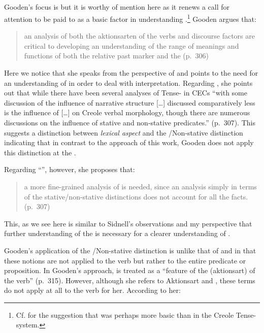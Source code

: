 \subsection{\citet{Gooden2008}}\label{sec:2.1.8}

Gooden’s focus is  but it is worthy of mention here as it renews
a call for attention to be paid to  as a basic factor in
understanding .\footnote{Cf. \citet{Alleyne1980} for the suggestion 
that  was perhaps more basic than  in the Creole
  Tense- system.} Gooden argues that:

\begin{quote}
an analysis of both the aktionsarten of the verbs and discourse
factors are critical to developing an understanding of the range of
meanings and functions of both the relative past marker and the
 (p.~306)
\end{quote}

Here we notice that she speaks from the perspective of  and
points to the need for an understanding of  in order to
deal with  interpretation.  Regarding , she points out that
while there have been several analyses of Tense- in CECs ``with
some discussion of the influence of narrative structure […] discussed
comparatively less is the influence of  […] on Creole
verbal morphology, though there are numerous discussions on the
influence of stative and non-stative predicates.” (p.~307).  This
suggests a distinction between \textit{lexical aspect} and the
\slash Non-stative distinction indicating that in contrast to the
approach of this work, Gooden does not apply this distinction at the
.

Regarding ``'', however, she proposes that:

\begin{quote}
  a more fine-grained analysis of  is needed, since an
  analysis simply in terms of the stative\slash non-stative distinctions
  does not account for all the facts. (p.~307)
\end{quote}

This, as we see here is similar to Sidnell’s observations and my
perspective that further understanding of the 
is necessary for a clearer understanding of .

Gooden’s application of the \slash Non-stative distinction is unlike
that of \citet{Winford1993} and \citet{Sidnell2002} in that these
notions are not applied to the verb but rather to the entire predicate
or proposition.  In Gooden’s approach,  is treated as a
``feature of the  (aktionsart) of the verb” (p.~315).
However, although she refers to Aktionsart and , these
terms do not apply at all to the verb for her.  According to her:

